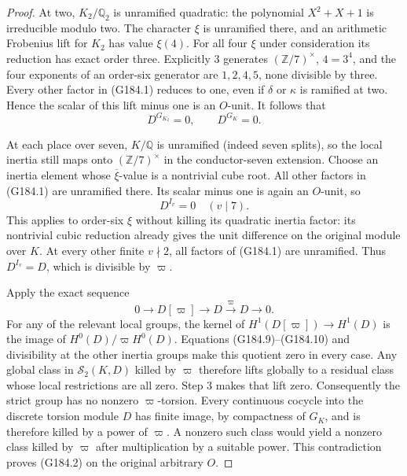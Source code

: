 \begin{proof}
At two, $K_2/\mathbb Q_2$ is unramified quadratic: the polynomial
$X^2+X+1$ is irreducible modulo two.
The character $\xi$ is unramified there, and an arithmetic
Frobenius lift for $K_2$ has value $\xi(4)$.
For all four $\xi$ under consideration its reduction has exact
order three.  Explicitly 3 generates $(\mathbb Z/7)^\times$,
$4=3^4$, and the four exponents of an order-six generator are
$1,2,4,5$, none divisible by three.
Every other factor in (G184.1) reduces to one, even if $\delta$
or $\kappa$ is ramified at two.  Hence the scalar of this lift
minus one is an $O$-unit.  It follows that
\[
                D^{G_{K_2}}=0,\qquad D^{G_K}=0.              \tag{G184.9}
\]

At each place over seven, $K/\mathbb Q$ is unramified (indeed
seven splits), so the local inertia still maps onto
$(\mathbb Z/7)^\times$ in the conductor-seven extension.
Choose an inertia element whose $\overline\xi$-value is a
nontrivial cube root.  All other factors in (G184.1) are
unramified there.  Its scalar minus one is again an $O$-unit,
so
\[
                              D^{I_v}=0\quad(v\mid7).
 \tag{G184.10}
\]
This applies to order-six $\xi$ without killing its quadratic
inertia factor: its nontrivial cubic reduction already gives
the unit difference on the original module over $K$.
At every other finite $v\nmid2$, all factors of (G184.1) are
unramified.  Thus $D^{I_v}=D$, which is divisible by $\varpi$.

Apply the exact sequence
\[
                  0\longrightarrow D[\varpi]
                    \longrightarrow D\xrightarrow{\varpi}D
                    \longrightarrow0.                      \tag{G184.11}
\]
For any of the relevant local groups, the kernel of
$H^1(D[\varpi])\to H^1(D)$ is the image of
$H^0(D)/\varpi H^0(D)$.
Equations (G184.9)--(G184.10) and divisibility at the other
inertia groups make this quotient zero in every case.
Any global class in $\mathcal S_2(K,D)$ killed by $\varpi$
therefore lifts globally to a residual class whose local
restrictions are all zero.  Step 3 makes that lift zero.
Consequently the strict group has no nonzero $\varpi$-torsion.
Every continuous cocycle into the discrete torsion module $D$
has finite image, by compactness of $G_K$, and is therefore
killed by a power of $\varpi$.
A nonzero such class would yield a nonzero class killed by
$\varpi$ after multiplication by a suitable power.
This contradiction proves (G184.2) on the original arbitrary $O$.


\end{proof}
